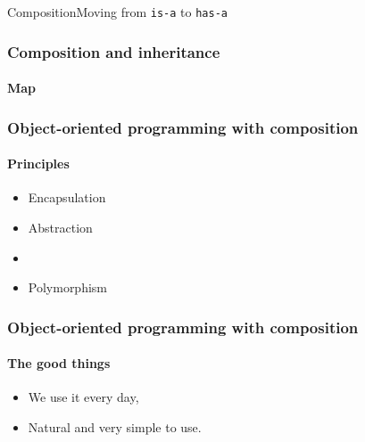 \begin{sepframe}{Composition}{Moving from \texttt{is-a} to \texttt{has-a}}
\end{sepframe}

\begin{frame}[fragile,c]
    \frametitle{Composition and inheritance}
    \framesubtitle{Map}

\end{frame}

\begin{frame}
    \frametitle{Object-oriented programming with composition}
    \framesubtitle{Principles}

    \begin{itemize}[<+->]
        \item Encapsulation
        \item Abstraction
        \item {}
        \item Polymorphism
    \end{itemize}
\end{frame}


\begin{frame}
    \frametitle{Object-oriented programming with composition}
    \framesubtitle{The good things}

    \begin{itemize}[<+->]
        \item We use it every day,
        \item Natural and very simple to use.
    \end{itemize}
\end{frame}

